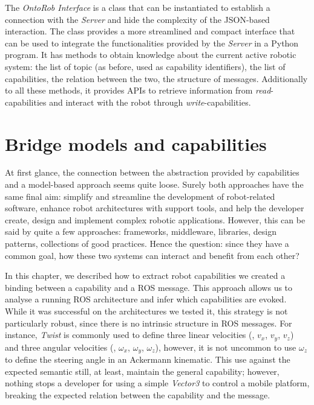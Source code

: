The \textit{OntoRob Interface} is a class that can be instantiated to establish a connection with the \textit{Server} and hide the complexity of the JSON-based interaction. The class provides a more streamlined and compact interface that can be used to integrate the functionalities provided by the \textit{Server} in a Python program. It has methods to obtain knowledge about the current active robotic system: the list of topic (as before, used as capability identifiers), the list of capabilities, the relation between the two, the structure of messages. Additionally to all these methods, it provides APIs to retrieve information from \textit{read}-capabilities and interact with the robot through \textit{write}-capabilities.

\section{Bridge models and capabilities}
At first glance, the connection between the abstraction provided by capabilities and a model-based approach seems quite loose. Surely both approaches have the same final aim: simplify and streamline the development of robot-related software, enhance robot architectures with support tools, and help the developer create, design and implement complex robotic applications. However, this can be said by quite a few approaches: frameworks, middleware, libraries, design patterns, collections of good practices. Hence the question: since they have a common goal, how these two systems can interact and benefit from each other?

In this chapter, we described how to extract robot capabilities we created a binding between a capability and a ROS message. This approach allows us to analyse a running ROS architecture and infer which capabilities are evoked. While it was successful on the architectures we tested it, this strategy is not particularly robust, since there is no intrinsic structure in ROS messages. For instance, \textit{Twist} is commonly used to define three linear velocities (\ie, $v_x$, $v_y$, $v_z$) and three angular velocities (\ie, $\omega_x$, $\omega_y$, $\omega_z$), however, it is not uncommon to use $\omega_z$ to define the steering angle in an Ackermann kinematic. This use against the expected semantic still, at least, maintain the general capability; however, nothing stops a developer for using a simple \textit{Vector3} to control a mobile platform, breaking the expected relation between the capability and the message.

